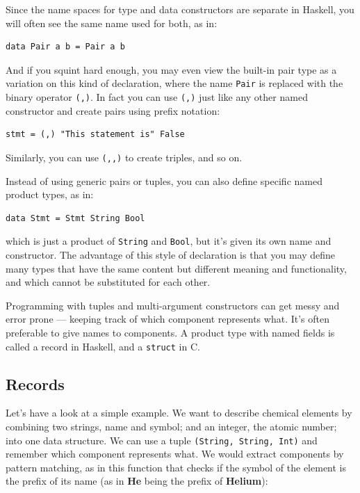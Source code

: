 Since the name spaces for type and data constructors are separate in
Haskell, you will often see the same name used for both, as in:

\begin{verbatim}
data Pair a b = Pair a b
\end{verbatim}

\noindent
And if you squint hard enough, you may even view the built-in pair type
as a variation on this kind of declaration, where the name \texttt{Pair}
is replaced with the binary operator \texttt{(,)}. In fact you can use
\texttt{(,)} just like any other named constructor and create pairs
using prefix notation:

\begin{verbatim}
stmt = (,) "This statement is" False
\end{verbatim}

\noindent
Similarly, you can use \texttt{(,,)} to create triples, and so on.

Instead of using generic pairs or tuples, you can also define specific
named product types, as in:

\begin{verbatim}
data Stmt = Stmt String Bool
\end{verbatim}

\noindent
which is just a product of \texttt{String} and \texttt{Bool}, but it's
given its own name and constructor. The advantage of this style of
declaration is that you may define many types that have the same content
but different meaning and functionality, and which cannot be substituted
for each other.

Programming with tuples and multi-argument constructors can get messy
and error prone --- keeping track of which component represents what.
It's often preferable to give names to components. A product type with
named fields is called a record in Haskell, and a \texttt{struct} in C.

\subsection{Records}\label{records}

Let's have a look at a simple example. We want to describe chemical
elements by combining two strings, name and symbol; and an integer, the
atomic number; into one data structure. We can use a tuple
\texttt{(String,\ String,\ Int)} and remember which component represents
what. We would extract components by pattern matching, as in this
function that checks if the symbol of the element is the prefix of its
name (as in \textbf{He} being the prefix of \textbf{Helium}):

